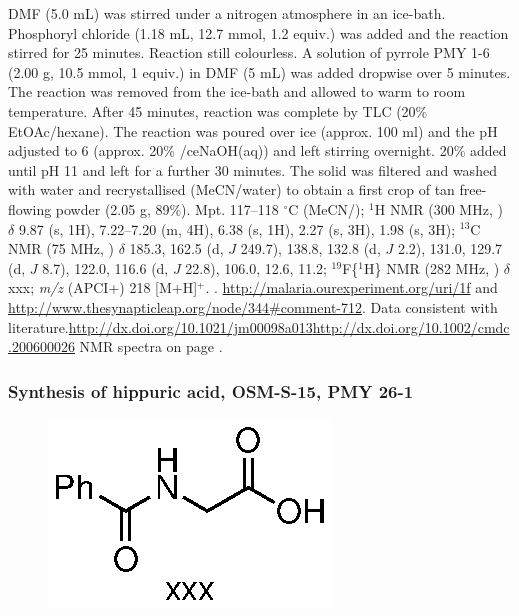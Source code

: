 \documentclass[12pt, a4paper,titlepage]{article}
\begin{document}
DMF (5.0 mL) was stirred under a nitrogen atmosphere in an ice-bath. Phosphoryl chloride (1.18 mL, 12.7 mmol, 1.2 equiv.) was added and the reaction stirred for 25 minutes. Reaction still colourless. A solution of pyrrole PMY 1-6 (2.00 g, 10.5 mmol, 1 equiv.) in DMF (5 mL) was added dropwise over 5 minutes. The reaction was removed from the ice-bath and allowed to warm to room temperature. After 45 minutes, reaction was complete by TLC (20\% EtOAc/hexane). The reaction was poured over ice (approx. 100 ml) and the pH adjusted to 6 (approx. 20\% /ce{NaOH(aq)}) and left stirring overnight. 20\%  added until pH 11 and left for a further 30 minutes. The solid was filtered and washed with water and recrystallised (MeCN/water) to obtain a first crop of tan free-flowing powder (2.05 g, 89\%). 
Mpt. 117--118 $^\circ$C (MeCN/); 
$^1$H NMR (300 MHz, ) $\delta$ 9.87 (s, 1H), 7.22--7.20 (m, 4H), 6.38 (s, 1H), 2.27 (s, 3H), 1.98 (s, 3H); 
$^{13}$C NMR (75 MHz, ) $\delta$ 185.3, 162.5 (d, $J$ 249.7), 138.8, 132.8 (d, $J$ 2.2), 131.0, 129.7 (d, $J$ 8.7), 122.0, 116.6 (d, $J$ 22.8), 106.0, 12.6, 11.2; 
$^{19}$F\{$^1$H\} NMR (282 MHz, ) $\delta$ xxx; 
\emph{m/z} (APCI+) 218 [M+H]$^+$. 
. 
\url{ http://malaria.ourexperiment.org/uri/1f} and \url{http://www.thesynapticleap.org/node/344#comment-712}.
Data consistent with literature.\url{http://dx.doi.org/10.1021/jm00098a013}\url{http://dx.doi.org/10.1002/cmdc.200600026} NMR spectra on page \pageref{spec:PMY2}.

\subsubsection*{Synthesis of hippuric acid, OSM-S-15, PMY 26-1}
\label{exp:PMY26}
	\begin{figure}[H]
	\begin{center}
	\includegraphics{exp/PMY26.eps}
	\end{center}
	\vspace{-25pt}	
	\end{figure}	
\end{document}
